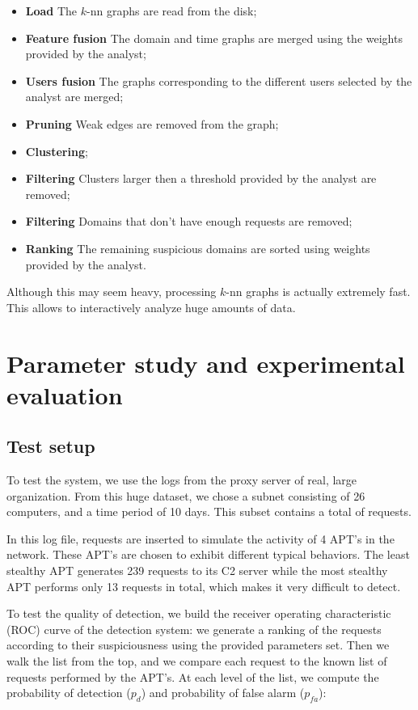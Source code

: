 \documentclass[conference]{IEEEtran}
\begin{document}
\begin{itemize}
\item \textbf{Load} The $k$-nn graphs are read from the disk;
\item \textbf{Feature fusion} The domain and time graphs are merged using the weights provided by the analyst;
\item \textbf{Users fusion} The graphs corresponding to the different users selected by the analyst are merged;
\item \textbf{Pruning} Weak edges are removed from the graph;
\item \textbf{Clustering};
\item \textbf{Filtering} Clusters larger then a threshold provided by the analyst are removed;
\item \textbf{Filtering} Domains that don't have enough requests are removed;
\item \textbf{Ranking} The remaining suspicious domains are sorted using weights provided by the analyst.
\end{itemize}

Although this may seem heavy, processing $k$-nn graphs is actually extremely fast. This allows to interactively analyze huge amounts of data.

\section{Parameter study and experimental evaluation}
\label{sec:evaluation}

\subsection{Test setup}

To test the system, we use the logs from the proxy server of real, large organization. From this huge dataset, we chose a subnet consisting of 26 computers, and a time period of 10 days. This subset contains a total of  requests.

In this log file, requests are inserted to simulate the activity of 4 APT's in the network. These APT's are chosen to exhibit different typical behaviors. The least stealthy APT generates 239 requests to its C2 server while the most stealthy APT performs only 13 requests in total, which makes it very difficult to detect.

To test the quality of detection, we build the receiver operating characteristic (ROC) curve of the detection system: we generate a ranking of the requests according to their suspiciousness using the provided parameters set. Then we walk the list from the top, and we compare each request to the known list of requests performed by the APT's. At each level of the list, we compute the probability of detection ($p_d$) and probability of false alarm ($p_{fa}$):
\end{document}

